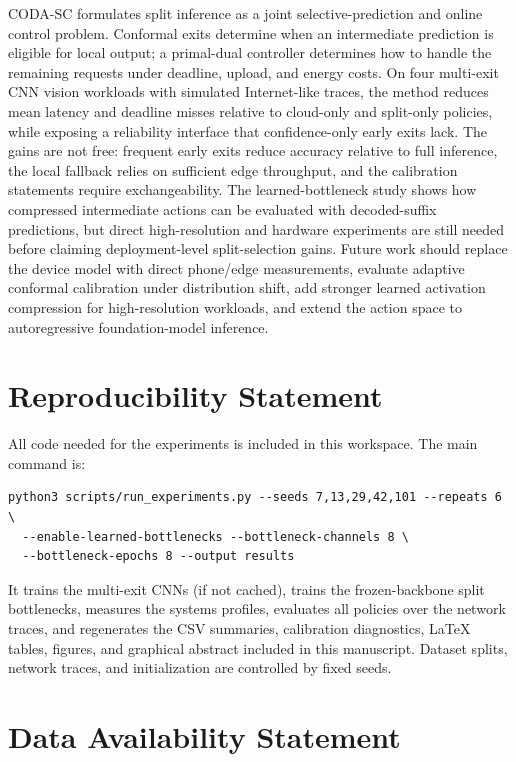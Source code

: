 \documentclass[11pt]{article}
\begin{document}
CODA-SC formulates split inference as a joint selective-prediction and online
control problem. Conformal exits determine when an intermediate prediction is
eligible for local output; a primal-dual controller determines how to handle the
remaining requests under deadline, upload, and energy costs. On four multi-exit
CNN vision workloads with simulated Internet-like traces, the method reduces
mean latency and deadline misses relative to cloud-only and split-only policies,
while exposing a reliability interface that confidence-only early exits lack.
The gains are not free: frequent early exits reduce accuracy relative to full
inference, the local fallback relies on sufficient edge throughput, and the
calibration statements require exchangeability. The learned-bottleneck study
shows how compressed intermediate actions can be evaluated with decoded-suffix
predictions, but direct high-resolution and hardware experiments are still
needed before claiming deployment-level split-selection gains. Future work
should replace the device model with direct phone/edge measurements, evaluate
adaptive conformal calibration under distribution shift, add stronger learned
activation compression for high-resolution workloads, and extend the action
space to autoregressive foundation-model inference.

\section*{Reproducibility Statement}

All code needed for the experiments is included in this workspace. The main
command is:
\begin{verbatim}
python3 scripts/run_experiments.py --seeds 7,13,29,42,101 --repeats 6 \
  --enable-learned-bottlenecks --bottleneck-channels 8 \
  --bottleneck-epochs 8 --output results
\end{verbatim}
It trains the multi-exit CNNs (if not cached), trains the frozen-backbone split
bottlenecks, measures the systems profiles, evaluates all policies over the
network traces, and regenerates the CSV summaries, calibration diagnostics,
LaTeX tables, figures, and graphical abstract included in this manuscript.
Dataset splits, network traces, and initialization are controlled by fixed seeds.

\section*{Data Availability Statement}
\end{document}
